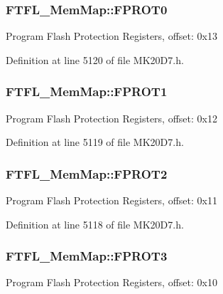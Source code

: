 \subsubsection[{\texorpdfstring{F\+P\+R\+O\+T0}{FPROT0}}]{ F\+T\+F\+L\+\_\+\+Mem\+Map\+::\+F\+P\+R\+O\+T0}\hypertarget{struct_f_t_f_l___mem_map_a30014fcd212c10c319008cddb63822d0}{}\label{struct_f_t_f_l___mem_map_a30014fcd212c10c319008cddb63822d0}
Program Flash Protection Registers, offset\+: 0x13 

Definition at line 5120 of file M\+K20\+D7.\+h.

\subsubsection[{\texorpdfstring{F\+P\+R\+O\+T1}{FPROT1}}]{ F\+T\+F\+L\+\_\+\+Mem\+Map\+::\+F\+P\+R\+O\+T1}\hypertarget{struct_f_t_f_l___mem_map_a569e0e5b6418cbbfa03ca0e36392f5ff}{}\label{struct_f_t_f_l___mem_map_a569e0e5b6418cbbfa03ca0e36392f5ff}
Program Flash Protection Registers, offset\+: 0x12 

Definition at line 5119 of file M\+K20\+D7.\+h.

\subsubsection[{\texorpdfstring{F\+P\+R\+O\+T2}{FPROT2}}]{ F\+T\+F\+L\+\_\+\+Mem\+Map\+::\+F\+P\+R\+O\+T2}\hypertarget{struct_f_t_f_l___mem_map_a5c4d9b10d85a28ad9cb482781dd89a84}{}\label{struct_f_t_f_l___mem_map_a5c4d9b10d85a28ad9cb482781dd89a84}
Program Flash Protection Registers, offset\+: 0x11 

Definition at line 5118 of file M\+K20\+D7.\+h.

\subsubsection[{\texorpdfstring{F\+P\+R\+O\+T3}{FPROT3}}]{ F\+T\+F\+L\+\_\+\+Mem\+Map\+::\+F\+P\+R\+O\+T3}\hypertarget{struct_f_t_f_l___mem_map_acec9424db7ce4f8bca85de7f87f27734}{}\label{struct_f_t_f_l___mem_map_acec9424db7ce4f8bca85de7f87f27734}
Program Flash Protection Registers, offset\+: 0x10 

